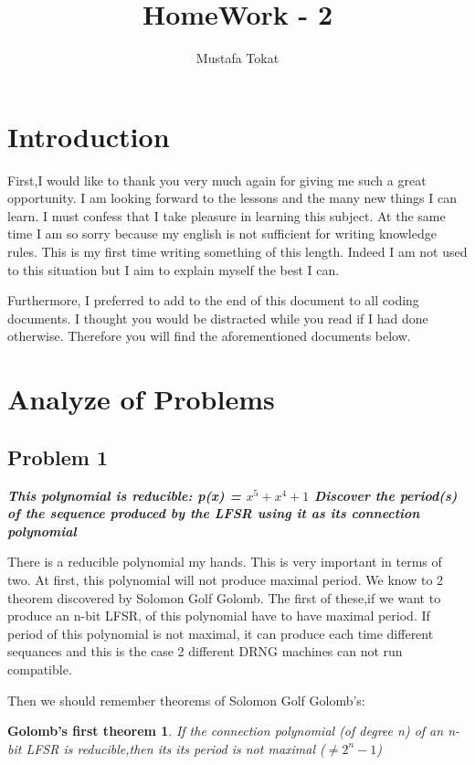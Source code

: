 \documentclass[a4paper, 11pt]{article}
\begin{document}
\title{HomeWork - 2}
\author{Mustafa Tokat}
\maketitle
\section{Introduction}

\indent First,I would like to thank you very much again for giving me such a great opportunity. 
I am looking forward to the lessons and the many new things I can learn. I must confess that I take pleasure in learning this subject. 
At the same time I am so sorry because my english is not sufficient for writing knowledge rules. 
This is my first time writing something of this length. Indeed I am not used to this situation but I aim to explain myself the best I can. 


Furthermore, I preferred to add to the end of this document to all coding documents. 
I thought you would be distracted while you read if I had done otherwise. 
Therefore you will find the aforementioned documents below.  

\section{Analyze of Problems}
\subsection*{Problem 1}

\textbf{\textit{This polynomial is reducible: p(x) = $x^{5} + x^{4} + 1$ Discover the period(s) of the sequence produced by the LFSR using it as its connection polynomial}}
            

\indent \singlespacing There is a reducible polynomial my hands. This is very important in terms of two. At first, 
this polynomial will not produce maximal period. We know to 2 theorem discovered by Solomon Golf Golomb.
The first of these,if we want to produce an n-bit LFSR, of this polynomial have to have  maximal period. If period of this polynomial is not maximal, 
it can produce each time different sequances and this is the case 2 different DRNG machines can  not run compatible. 

Then we should remember theorems of Solomon Golf Golomb's: 


\newtheorem*{thm}{Golomb's first theorem}
\begin{thm}
    If the connection polynomial (of degree n) of an n-bit LFSR is reducible,then its its period is not maximal  ($\neq$$2^{n}-1$)
\end{thm}
\end{document}
